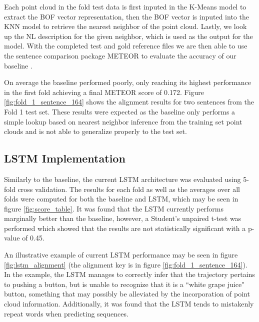\documentclass[letterpaper, 12 pt, conference]{ieeeconf}
\begin{document}
Each point cloud in the fold test data is first inputed in the K-Means model to extract the BOF vector representation, then the BOF vector is inputed into the KNN model to retrieve the nearest neighbor of the point cloud. Lastly, we look up the NL description for the given neighbor, which is used as the output for the model. With the completed test and gold reference files we are then able to use the sentence comparison package METEOR to evaluate the accuracy of our baseline \cite{Denkowski14meteoruniversal}.

On average the baseline performed poorly, only reaching its highest performance in the first fold achieving a final METEOR score of 0.172. Figure \ref{fig:fold_1_sentence_164} shows the alignment results for two sentences from the Fold 1 test set. These results were expected as the baseline only performs a simple lookup based on nearest neighbor inference from the training set point clouds and is not able to generalize properly to the test set.

\subsection{LSTM Implementation}

Similarly to the baseline, the current LSTM architecture was evaluated using 5-fold cross validation. The results for each fold as well as the averages over all folds were computed for both the baseline and LSTM, which may be seen in figure \ref{fig:score_table}. It was found that the LSTM currently performs marginally better than the baseline, however, a Student's unpaired t-test was performed which showed that the results are not statistically significant with a p-value of 0.45. 

An illustrative example of current  LSTM performance may be seen in figure \ref{fig:lstm_alignment} (the alignment key is in figure \ref{fig:fold_1_sentence_164}). In the example, the LSTM manages to correctly infer that the trajectory pertains to pushing a button, but is unable to recognize that it is a ``white grape juice" button, something that may possibly be alleviated by the incorporation of point cloud information. Additionally, it was found that the LSTM tends to mistakenly repeat words when predicting sequences. 
\end{document}
